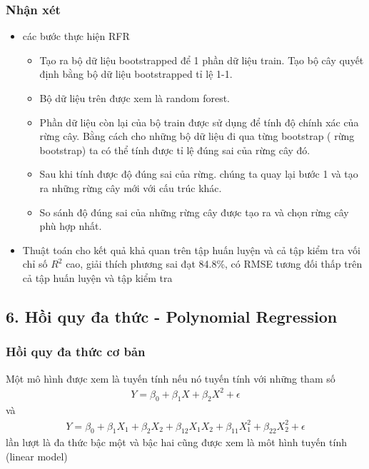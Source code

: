 \documentclass{article}
\begin{document}
	\subsubsection{Nhận xét}
	\begin{itemize}
		\item các bước thực hiện RFR
		\begin{itemize}
			\item Tạo ra bộ dữ liệu bootstrapped để 1 phần dữ liệu train. Tạo bộ cây quyết định bằng bộ dữ liệu bootstrapped tỉ lệ 1-1.
			\item Bộ dữ liệu trên được xem là random forest.
			\item Phần dữ liệu còn lại của bộ train được sử dụng để tính độ chính xác của rừng cây. Bằng cách cho những bộ dữ liệu đi qua từng bootstrap ( rừng bootstrap) ta có thể tính được tỉ lệ đúng sai của rừng cây đó.
			\item Sau khi tính được độ đúng sai của rừng. chúng ta quay lại bước 1 và tạo ra những rừng cây mới với cấu trúc khác.
			\item So sánh độ đúng sai của những rừng cây được tạo ra và chọn rừng cây phù hợp nhất.
		\end{itemize}
		\item Thuật toán cho kết quả khả quan trên tập huấn luyện và cả tập kiểm tra vối chỉ số $R^2$ cao, giải thích phương sai đạt 84.8\%, có RMSE tương đối thấp trên cả tập huấn luyện và tập kiểm tra		
	\end{itemize}
	\subsection{6. Hồi quy đa thức - Polynomial Regression}
	\subsubsection{Hồi quy đa thức cơ bản}
	\qquad Một mô hình được xem là tuyến tính nếu nó tuyến tính với những tham số
	\begin{align*}
		Y = \beta_0 + \beta_1X + \beta_2X^2 + \epsilon
	\end{align*}
	và 
	\begin{align*}
	Y = \beta_0 + \beta_1X_1 + \beta_2X_2 +  \beta_12X_1X_2 + \beta_{11}X_1^2 + \beta_{22}X_2^2 + \epsilon
	\end{align*}
	lần lượt là đa thức bậc một và bậc hai cũng được xem là môt hình tuyến tính (linear model)
	
\end{document}
